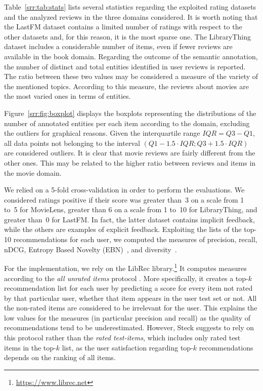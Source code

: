 Table~\ref{srr:tab:stats} lists several statistics regarding the exploited rating datasets and the analyzed reviews in the three domains considered. It is worth noting that the LastFM dataset contains a limited number of ratings with respect to the other datasets and, for this reason, it is the most sparse one. The LibraryThing dataset includes a considerable number of items, even if fewer reviews are available in the book domain. Regarding the outcome of the semantic annotation, the number of distinct and total entities identified in user reviews is reported. The ratio between these two values may be considered a measure of the variety of the mentioned topics. According to this measure, the reviews about movies are the most varied ones in terms of entities.

Figure~\ref{srr:fig:boxplot} displays the boxplots representing the distributions of the number of annotated entities per each item according to the domain, excluding the outliers for graphical reasons. Given the interquartile range $IQR = Q3 - Q1$, all data points not belonging to the interval $(Q1 - 1.5 \cdot IQR; Q3 + 1.5 \cdot IQR)$ are considered outliers. It is clear that movie reviews are fairly different from the other ones. This may be related to the higher ratio between reviews and items in the movie domain.

We relied on a 5-fold cross-validation in order to perform the evaluations. We considered ratings positive if their score was greater than~3 on a scale from 1 to~5 for MovieLens, greater than 6 on a scale from 1 to~10 for LibraryThing, and greater than~0 for LastFM. In fact, the latter dataset contains implicit feedback, while the others are examples of explicit feedback. Exploiting the lists of the top-10 recommendations for each user, we computed the measures of precision, recall, nDCG, Entropy Based Novelty (EBN)~\cite{Bellogin2010}, and diversity~\cite{Zhang2008}.

For the implementation, we rely on the LibRec library.\footnote{\url{https://www.librec.net}} It computes measures according to the \emph{all unrated items} protocol \cite{Steck2013}. More specifically, it creates a top-$k$ recommendation list for each user by predicting a score for every item not rated by that particular user, whether that item appears in the user test set or not. All the non-rated items are considered to be irrelevant for the user. This explains the low values for the measures (in particular precision and recall) as the quality of recommendations tend to be underestimated. However, Steck \cite{Steck2013} suggests to rely on this protocol rather than the \emph{rated test-items}, which includes only rated test items in the top-$k$ list, as the user satisfaction regarding top-$k$ recommendations depends on the ranking of all items.

